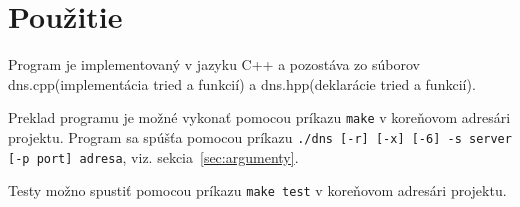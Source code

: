 \chapter{Použitie}
Program je implementovaný v jazyku C++ a pozostáva zo súborov dns.cpp(implementácia tried a funkcií) a dns.hpp(deklarácie tried a funkcií).

Preklad programu je možné vykonať pomocou príkazu \texttt{make} v koreňovom adresári projektu. Program sa spúšťa pomocou príkazu \texttt{./dns [-r] [-x] [-6] -s server [-p port] adresa}, viz. sekcia~\ref{sec:argumenty}.

Testy možno spustiť pomocou príkazu \texttt{make test} v koreňovom adresári projektu.